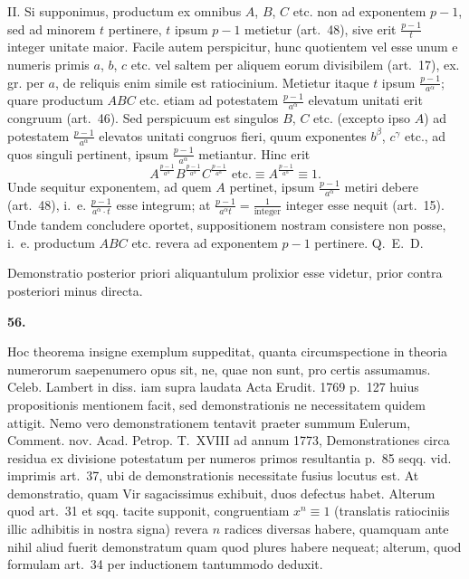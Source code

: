 \documentclass[12pt,a4paper]{article}
\theoremstyle{plain}
\theoremstyle{definition}
\theoremstyle{remark}
\begin{document}
II. Si supponimus, productum ex omnibus $A$, $B$, $C$ etc. non ad exponentem $p-1$, sed ad minorem $t$ pertinere, $t$ ipsum $p-1$ metietur (art.~48), sive erit $\frac{p-1}{t}$ integer unitate maior. Facile autem perspicitur, hunc quotientem vel esse unum e numeris primis $a$, $b$, $c$ etc. vel saltem per aliquem eorum divisibilem (art.~17), ex. gr. per $a$, de reliquis enim simile est ratiocinium. Metietur itaque $t$ ipsum $\frac{p-1}{a^\alpha}$; quare productum $ABC$ etc. etiam ad potestatem $\frac{p-1}{a^\alpha}$ elevatum unitati erit congruum (art.~46). Sed perspicuum est singulos $B$, $C$ etc. (excepto ipso $A$) ad potestatem $\frac{p-1}{a^\alpha}$ elevatos unitati congruos fieri, quum exponentes $b^\beta$, $c^\gamma$ etc., ad quos singuli pertinent, ipsum $\frac{p-1}{a^\alpha}$ metiantur. Hinc erit
\[A^{\frac{p-1}{a^\alpha}} B^{\frac{p-1}{a^\alpha}} C^{\frac{p-1}{a^\alpha}} \text{ etc.} \equiv A^{\frac{p-1}{a^\alpha}} \equiv 1.\]
Unde sequitur exponentem, ad quem $A$ pertinet, ipsum $\frac{p-1}{a^\alpha}$ metiri debere (art.~48), i.~e. $\frac{p-1}{a^\alpha \cdot t}$ esse integrum; at $\frac{p-1}{a^\alpha t} = \frac{1}{\text{integer}}$ integer esse nequit (art.~15). Unde tandem concludere oportet, suppositionem nostram consistere non posse, i.~e. productum $ABC$ etc. revera ad exponentem $p-1$ pertinere. Q.~E.~D.

Demonstratio posterior priori aliquantulum prolixior esse videtur, prior contra posteriori minus directa.

\setcounter{satz}{56}
\addtocounter{satz}{-1}
\textbf{56.}

Hoc theorema insigne exemplum suppeditat, quanta circumspectione in theoria numerorum saepenumero opus sit, ne, quae non sunt, pro certis assumamus. Celeb. Lambert in diss. iam supra laudata Acta Erudit. 1769 p.~127 huius propositionis mentionem facit, sed demonstrationis ne necessitatem quidem attigit. Nemo vero demonstrationem tentavit praeter summum Eulerum, Comment. nov. Acad. Petrop. T.~XVIII ad annum 1773, Demonstrationes circa residua ex divisione potestatum per numeros primos resultantia p.~85 seqq. vid. imprimis art.~37, ubi de demonstrationis necessitate fusius locutus est. At demonstratio, quam Vir sagacissimus exhibuit, duos defectus habet. Alterum quod art.~31 et sqq. tacite supponit, congruentiam $x^n \equiv 1$ (translatis ratiociniis illic adhibitis in nostra signa) revera $n$ radices diversas habere, quamquam ante nihil aliud fuerit demonstratum quam quod plures habere nequeat; alterum, quod formulam art.~34 per inductionem tantummodo deduxit.
\end{document}
